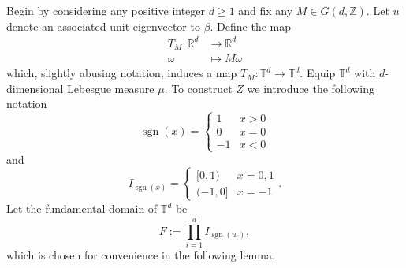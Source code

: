 \documentclass{amsart}
\DeclareMathOperator{\sgn}{sgn}
\newcommand{\RR}{\mathbb{R}}
\newcommand{\TT}{\mathbb{T}}
\newcommand{\ZZ}{\mathbb{Z}}
\begin{document}
Begin by considering any positive integer $d\geq 1$ and fix any $M\in G(d,\ZZ)$. Let $u$ denote an associated unit eigenvector to $\beta$. Define the map 
\begin{align*}
    T_M: \RR^d &\rightarrow \RR^d\\
    \omega &\mapsto M\omega
\end{align*}
which, slightly abusing notation, induces a map $T_M: \TT^d\rightarrow \TT^d$. Equip $\TT^d$ with $d$-dimensional Lebesgue measure $\mu$. To construct $Z$ we introduce the following notation
\[\sgn(x) = \begin{cases}
    1 & x>0\\
    0 & x=0\\
    -1 & x<0
\end{cases}\]
and 
\[I_{\sgn(x)} = \begin{cases}
    [0,1) & x = 0, 1\\
    (-1,0] & x = -1
\end{cases}.\]
Let the fundamental domain of $\TT^d$ be
\[F:= \prod_{i=1}^d I_{\sgn(u_i)},\]
which is chosen for convenience in the following lemma. 
\end{document}
